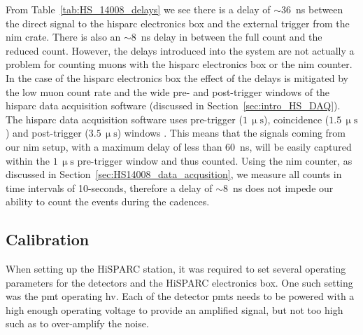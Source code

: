 
From Table~\ref{tab:HS_14008_delays} we see there is a delay of $\sim36$~ns between the direct signal to the \gls{hisparc} electronics box and the external trigger from the \gls{nim} crate. There is also an $\sim8$~ns delay in between the full count and the reduced count. However, the delays introduced into the system are not actually a problem for counting muons with the \gls{hisparc} electronics box or the \gls{nim} counter. In the case of the \gls{hisparc} electronics box the effect of the delays is mitigated by the low muon count rate and the wide pre- and post-trigger windows of the \gls{hisparc} data acquisition software (discussed in Section~\ref{sec:intro_HS_DAQ}). The \gls{hisparc} data acquisition software uses pre-trigger ($1\,\upmu\mathrm{s}$), coincidence ($1.5\,\upmu\mathrm{s}$) and post-trigger ($3.5\,\upmu\mathrm{s}$) windows \citep{fokkema_hisparc_2012}. This means that the signals coming from our \gls{nim} setup, with a maximum delay of less than 60~ns, will be easily captured within the $1\,\upmu\mathrm{s}$ pre-trigger window and thus counted. Using the \gls{nim} counter, as discussed in Section~\ref{sec:HS14008_data_acqusition}, we measure all counts in time intervals of 10-seconds, therefore a delay of $\sim$8~ns does not impede our ability to count the events during the cadences.


\subsection{Calibration}

When setting up the HiSPARC station, it was required to set several operating parameters for the detectors and the HiSPARC electronics box. One such setting was the \gls{pmt} operating \gls{hv}. Each of the detector \glspl{pmt} needs to be powered with a high enough operating voltage to provide an amplified signal, but not too high such as to over-amplify the noise.

